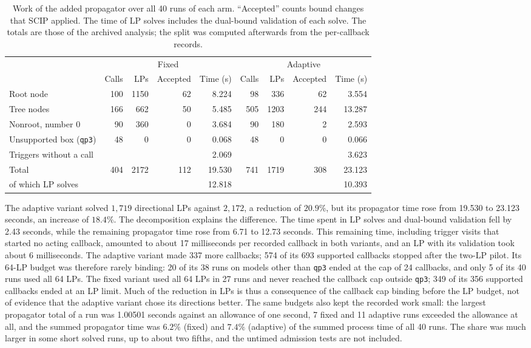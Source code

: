 \begin{table}[htbp]
\centering
\footnotesize
\setlength{\tabcolsep}{4pt}
\begin{tabular}{@{}lrrrrrrrr@{}}
\toprule
& \multicolumn{4}{c}{Fixed} & \multicolumn{4}{c}{Adaptive}\\
\cmidrule(lr){2-5}\cmidrule(l){6-9}
& Calls & LPs & Accepted & Time (s) & Calls & LPs & Accepted & Time (s)\\
\midrule
Root node & 100 & 1150 & 62 & 8.224 & 98 & 336 & 62 & 3.554\\
Tree nodes & 166 & 662 & 50 & 5.485 & 505 & 1203 & 244 & 13.287\\
Nonroot, number 0 & 90 & 360 & 0 & 3.684 & 90 & 180 & 2 & 2.593\\
Unsupported box (\texttt{qp3}) & 48 & 0 & 0 & 0.068 & 48 & 0 & 0 & 0.066\\
Triggers without a call & & & & 2.069 & & & & 3.623\\
\midrule
Total & 404 & 2172 & 112 & 19.530 & 741 & 1719 & 308 & 23.123\\
\addlinespace
\quad of which LP solves & & & & 12.818 & & & & 10.393\\
\bottomrule
\end{tabular}
\caption{Work of the added propagator over all 40 runs of each arm.
``Accepted'' counts bound changes that SCIP applied. The time of LP solves
includes the dual-bound validation of each solve. The totals are those of the
archived analysis; the split was computed afterwards from the per-callback
records.}
\label{tab:work}
\end{table}

The adaptive variant solved $1{,}719$ directional LPs against $2{,}172$, a
reduction of $20.9\%$, but its propagator time rose from 19.530 to 23.123 seconds,
an increase of $18.4\%$. The decomposition explains the difference. The time
spent in LP solves and dual-bound validation fell by 2.43 seconds, while the
remaining propagator time rose from 6.71 to 12.73 seconds. This remaining time,
including trigger visits that started no acting callback, amounted to about 17
milliseconds per recorded callback in both variants, and an LP with its
validation took about 6 milliseconds. The adaptive variant made
337 more callbacks; 574 of its 693 supported callbacks stopped after the
two-LP pilot. Its 64-LP budget was therefore rarely binding: 20 of its 38 runs
on models other than \texttt{qp3} ended at the cap of 24 callbacks, and only 5 of
its 40 runs used all 64 LPs. The fixed variant used all 64 LPs in 27 runs and
never reached the callback cap outside \texttt{qp3}; 349 of its 356 supported
callbacks ended at an LP limit. Much of the reduction in LPs is thus a consequence
of the callback cap binding before the LP budget, not of evidence that the
adaptive variant chose its directions better. The same budgets also kept the
recorded work small: the largest propagator total of a run was 1.00501 seconds
against an allowance of one second, 7 fixed and 11 adaptive runs exceeded the
allowance at all, and the summed propagator time was $6.2\%$ (fixed) and $7.4\%$
(adaptive) of the summed process time of all 40 runs. The share was much larger
in some short solved runs, up to about two fifths, and the untimed admission
tests are not included.

